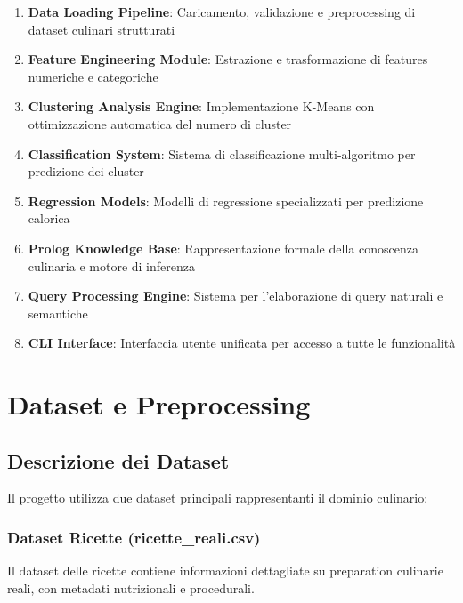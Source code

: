 \documentclass[12pt,a4paper]{article}
\begin{document}
\begin{enumerate}
    \item \textbf{Data Loading Pipeline}: Caricamento, validazione e preprocessing di dataset culinari strutturati
    \item \textbf{Feature Engineering Module}: Estrazione e trasformazione di features numeriche e categoriche
    \item \textbf{Clustering Analysis Engine}: Implementazione K-Means con ottimizzazione automatica del numero di cluster
    \item \textbf{Classification System}: Sistema di classificazione multi-algoritmo per predizione dei cluster
    \item \textbf{Regression Models}: Modelli di regressione specializzati per predizione calorica
    \item \textbf{Prolog Knowledge Base}: Rappresentazione formale della conoscenza culinaria e motore di inferenza
    \item \textbf{Query Processing Engine}: Sistema per l'elaborazione di query naturali e semantiche
    \item \textbf{CLI Interface}: Interfaccia utente unificata per accesso a tutte le funzionalità
\end{enumerate}

\section{Dataset e Preprocessing}

\subsection{Descrizione dei Dataset}

Il progetto utilizza due dataset principali rappresentanti il dominio culinario:

\subsubsection{Dataset Ricette (ricette\_reali.csv)}

Il dataset delle ricette contiene informazioni dettagliate su preparation culinarie reali, con metadati nutrizionali e procedurali.
\end{document}
